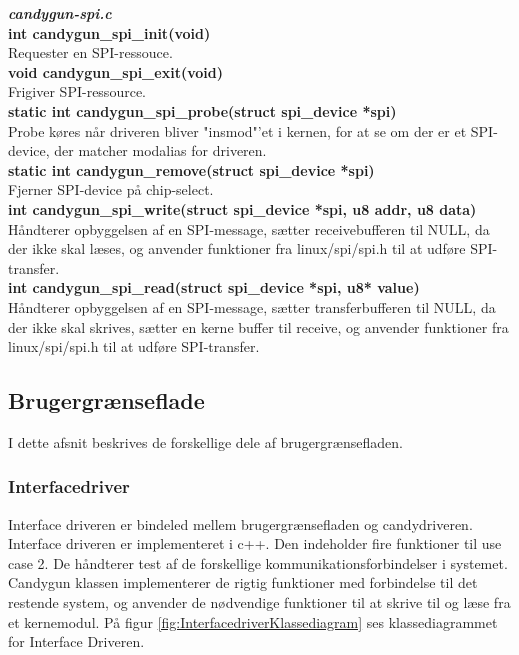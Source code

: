 \noindent\textit{\textbf{candygun-spi.c}} \\

\noindent\textbf{int candygun\_spi\_init(void)} \\
Requester en SPI-ressouce. \\

\noindent\textbf{void candygun\_spi\_exit(void)} \\
Frigiver SPI-ressource. \\

\noindent\textbf{static int candygun\_spi\_probe(struct spi\_device *spi)} \\
Probe køres når driveren bliver "insmod"'et i kernen, for at se om der er et SPI-device, der matcher modalias for driveren.\\

\noindent\textbf{static int candygun\_remove(struct spi\_device *spi)} \\ 
Fjerner SPI-device på chip-select.\\

\noindent\textbf{int candygun\_spi\_write(struct spi\_device *spi, u8 addr, u8 data)} \\
Håndterer opbyggelsen af en SPI-message, sætter receivebufferen til NULL, da der ikke skal læses, og anvender funktioner fra linux/spi/spi.h til at udføre SPI-transfer. \\

\noindent\textbf{int candygun\_spi\_read(struct spi\_device *spi, u8* value)} \\
Håndterer opbyggelsen af en SPI-message, sætter transferbufferen til NULL, da der ikke skal skrives, sætter en kerne buffer til receive, og anvender funktioner fra linux/spi/spi.h til at udføre SPI-transfer.  \\


\subsection{Brugergrænseflade}
I dette afsnit beskrives de forskellige dele af brugergrænsefladen.

\subsubsection{Interfacedriver}
Interface driveren er bindeled mellem brugergrænsefladen og candydriveren. Interface driveren er implementeret i c++. Den indeholder fire funktioner til use case 2. De håndterer test af de forskellige kommunikationsforbindelser i systemet. Candygun klassen implementerer de rigtig funktioner med forbindelse til det restende system, og anvender de nødvendige funktioner til at skrive til og læse fra et kernemodul. På figur \ref{fig:InterfacedriverKlassediagram} ses klassediagrammet for Interface Driveren. 

